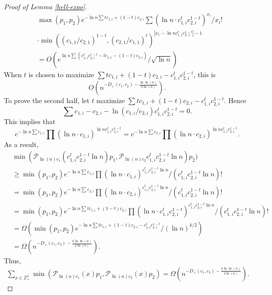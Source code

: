 \documentclass[11pt]{article}
\newcommand{\Enote}[1]{\begin{center}\fbox{\begin{minipage}{35em}
                        {{\bf Emmanuel Note:} {#1}} \end{minipage}}\end{center}}
\newcommand{\Cnote}[1]{\begin{center}\fbox{\begin{minipage}{35em}
                        {{\bf Colin Note:} {#1}} \end{minipage}}\end{center}}
\newcommand{\dd}{D_+}
\newcommand{\mZ}{\mathbb{Z}}
\newcommand{\1}{\mathbb{1}}
\begin{document}
\begin{proof}[Proof of Lemma \ref{hell-expo}]
\begin{align}
&\max(p_1,p_2) e^{-\ln n\sum tc_{1,i}+ (1-t)c_{2,i} }\sum \left(\ln n\cdot c_{1,i}^t c_{2,i}^{1-t}\right)^{x_i}/x_i!\\
&\cdot \min\left ((c_{1,1}/c_{2,1})^{1-t},(c_{2,1}/c_{1,1})^t\right)^{|x_1-\ln n c_{1,1}^tc_{2,1}^{1-t}|-1}\\
&=O\left(e^{\ln n\sum (c_{1,i}^t c_{2,i}^{1-t}- tc_{1,i}- (1-t)c_{2,i})}/\sqrt{\ln n}\right)
\end{align} 
When $t$ is chosen to maximize $\sum tc_{1,i}+(1-t)c_{2,i}-c_{1,i}^tc_{2,i}^{1-t}$, this is $$O\left(n^{- \dd(c_1,c_2) - \frac{\ln\ln(n)}{2 \ln(n)}} \right).$$
To prove the second half, let $t$ maximize $\sum tc_{1,i}+(1-t)c_{2,i}-c_{1,i}^tc_{2,i}^{1-t}$. Hence $$\sum c_{1,i}-c_{2,i}-\ln (c_{1,i}/c_{2,i})c_{1,i}^tc_{2,i}^{1-t}=0.$$ This implies that 
\[e^{-\ln n\sum c_{1,i}}\prod (\ln n\cdot c_{1,i})^{\ln nc_{1,i}^tc_{2,i}^{1-t}}=e^{-\ln n\sum c_{2,i}}\prod (\ln n\cdot c_{2,i})^{\ln nc_{1,i}^tc_{2,i}^{1-t}}.\] As a result, 
\begin{align}
&\min(\mathcal{P}_{\ln(n) c_1}(c_{1,i}^tc_{2,i}^{1-t}\ln n) p_{1} ,  \mathcal{P}_{\ln(n) c_2}c_{1,i}^tc_{2,i}^{1-t}\ln n) p_{2})\\
&\ge\min(p_1,p_2) e^{-\ln n\sum c_{1,i}}\prod (\ln n\cdot c_{1,i})^{c_{1,i}^tc_{2,i}^{1-t}\ln n}/(c_{1,i}^tc_{2,i}^{1-t}\ln n)!\\
&=\min(p_1,p_2)e^{-\ln n\sum c_{2,i}}\prod (\ln n\cdot c_{2,i})^{c_{1,i}^tc_{2,i}^{1-t}\ln n}/(c_{1,i}^tc_{2,i}^{1-t}\ln n)!\\
&=\min(p_1,p_2)e^{-\ln n\sum tc_{1,i}+(1-t)c_{2,i}}\prod (\ln n\cdot c_{1,i}^tc_{2,i}^{1-t})^{c_{1,i}^tc_{2,i}^{1-t}\ln n}/(c_{1,i}^tc_{2,i}^{1-t}\ln n)!\\
&=\Omega(\min(p_1,p_2)e^{-\ln n\sum tc_{1,i}+(1-t)c_{2,i}-c_{1,i}^tc_{2,i}^{1-t}}/(\ln n)^{k/2})\\
&=\Omega \left(n^{- \dd(c_1,c_2) - \frac{k \ln\ln(n)}{2 \ln(n)}} \right).
\end{align}
Thus, 
\begin{align}
\sum_{x \in \mZ_+^k} \min(\mathcal{P}_{\ln(n) c_1}(x) p_{1} ,  \mathcal{P}_{\ln(n) c_2}(x) p_{2}) = \Omega \left(n^{- \dd(c_1,c_2) - \frac{k \ln\ln(n)}{2 \ln(n)}} \right) .
\end{align}
\end{proof}

\end{document}
